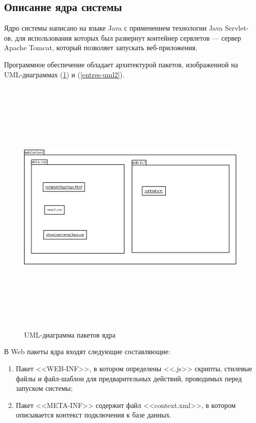 \subsection{Описание ядра системы}
Ядро системы написано на языке Java с применением технологии Java Servlet-ов,
для использования которых был развернут контейнер сервлетов --- сервер
Apache Tomcat, который позволяет запускать веб-приложения.

Программное обеспечение обладает архитектурой пакетов, изображенной на
UML-диаграммах (\ref{entres-uml1}) и (\ref{entres-uml2}).
\begin{figure}[h]
\caption{UML-диаграмма пакетов ядра}
	\label{entres-uml1}
\begin{center}
  \includegraphics[width=6in,height=5in]{pics/core-web-content.jpeg}
\end{center}
\end{figure}
В Web пакеты ядра входят следующие составляющие:
\begin{enumerate}
\item Пакет <<WEB-INF>>, в котором определены <<.js>> скрипты, стилевые файлы и
	файл-шаблон для предварительных действий, проводимых перед запуском
		системы;
\item Пакет <<META-INF>> содержит файл <<context.xml>>,
	в котором описывается контекст подключения к базе данных.
\end{enumerate}

